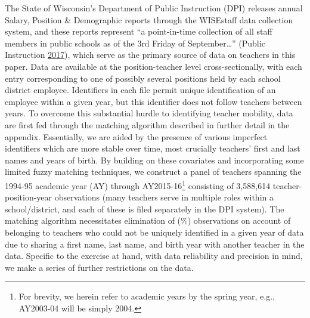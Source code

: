 \documentclass[12pt,]{article}
\let\rmarkdownfootnote\footnote%
\def\footnote{\protect\rmarkdownfootnote}
\begin{document}
The State of Wisconsin's Department of Public Instruction (DPI) releases
annual Salary, Position \& Demographic reports through the WISEstaff
data collection system, and these reports represent ``a point-in-time
collection of all staff members in public schools as of the 3rd Friday
of September\ldots{}'' (Public Instruction
\protect\hyperlink{ref-dpi}{2017}), which serve as the primary source of
data on teachers in this paper. Data are available at the
position-teacher level cross-sectionally, with each entry corresponding
to one of possibly several positions held by each school district
employee. Identifiers in each file permit unique identification of an
employee within a given year, but this identifier does not follow
teachers between years. To overcome this substantial hurdle to
identifying teacher mobility, data are first fed through the matching
algorithm described in further detail in the appendix. Essentially, we
are aided by the presence of various imperfect identifiers which are
more stable over time, most crucially teachers' first and last names and
years of birth. By building on these covariates and incorporating some
limited fuzzy matching techniques, we construct a panel of teachers
spanning the 1994-95 academic year (AY) through AY2015-16\footnote{For
  brevity, we herein refer to academic years by the spring year, e.g.,
  AY2003-04 will be simply 2004.} consisting of 3,588,614
teacher-position-year observations (many teachers serve in multiple
roles within a school/district, and each of these is filed separately in
the DPI system). The matching algorithm necessitates elimination of (\%)
observations on account of belonging to teachers who could not be
uniquely identified in a given year of data due to sharing a first name,
last name, and birth year with another teacher in the data. Specific to
the exercise at hand, with data reliability and precision in mind, we
make a series of further restrictions on the data.
\end{document}
